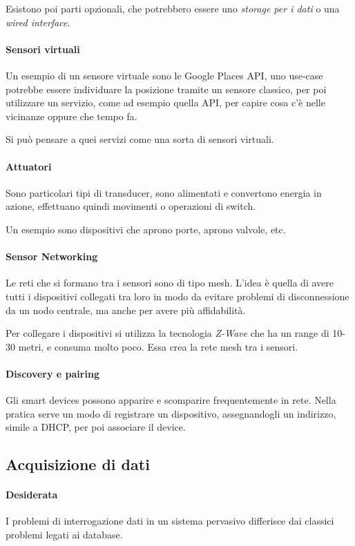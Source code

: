 Esistono poi parti opzionali, che potrebbero essere uno \emph{storage per i dati} o 
una \emph{wired interface}.

\paragraph{Sensori virtuali}
Un esempio di un sensore virtuale sono le Google Places API, 
uno use-case potrebbe essere individuare la posizione 
tramite un sensore classico, per poi utilizzare 
un servizio, come ad esempio quella API, per capire cosa c'è 
nelle vicinanze oppure che tempo fa. 

Si può pensare a quei servizi come una sorta di sensori virtuali.

\paragraph{Attuatori}
Sono particolari tipi di transducer, sono alimentati e convertono 
energia in azione, effettuano quindi movimenti o operazioni 
di switch.

Un esempio sono dispositivi che aprono porte, aprono valvole, 
etc.

\paragraph{Sensor Networking}
Le reti che si formano tra i sensori sono di tipo mesh. 
L'idea è quella di avere tutti i dispositivi collegati tra loro 
in modo da evitare problemi di disconnessione da un nodo centrale, 
ma anche per avere più affidabilità.

Per collegare i dispositivi si utilizza la tecnologia \emph{Z-Wave}
che ha un range di 10-30 metri, e consuma molto poco. Essa 
crea la rete mesh tra i sensori.

\paragraph{Discovery e pairing}
Gli smart devices possono apparire e scomparire frequentemente in rete. 
Nella pratica serve un modo di registrare un dispositivo, assegnandogli un 
indirizzo, simile a DHCP, per poi associare il device.

\subsection{Acquisizione di dati}

\paragraph{Desiderata}
I problemi di interrogazione dati in un sistema pervasivo differisce 
dai classici problemi legati ai database.

